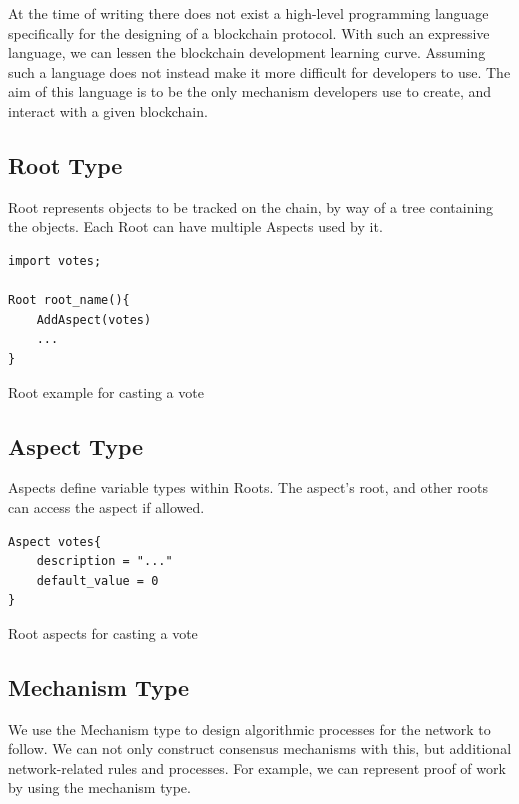 \documentclass[12pt, titlepage, twocolumn]{report}
\begin{document}
At the time of writing there does not exist a high-level programming language specifically for the designing of a blockchain protocol. With such an expressive language, we can lessen the blockchain development learning curve. Assuming such a language does not instead make it more difficult for developers to use. The aim of this language is to be the only mechanism developers use to create, and interact with a given blockchain.


\subsection{Root Type}
Root represents objects to be tracked on the chain,  by way of a tree containing the objects. Each Root can have multiple Aspects used by it.

\begin{listing}[ht]
\begin{minipage}{\linewidth}
\begin{lstlisting}
import votes;

Root root_name(){
	AddAspect(votes)
	...
}
\end{lstlisting}
\end{minipage}
\caption{Root example for casting a vote}
\label{code:2}
\end{listing}


\subsection{Aspect Type}
Aspects define variable types within Roots. The aspect's root, and other roots can access the aspect if allowed.

\begin{listing}[ht]
\begin{minipage}{\linewidth}
\begin{lstlisting}
Aspect votes{
	description = "..."
	default_value = 0
}

\end{lstlisting}
\end{minipage}
\caption{Root aspects for casting a vote}
\label{code:4}
\end{listing}



\subsection{Mechanism Type}
We use the Mechanism type to design algorithmic processes for the network to follow. We can not only construct consensus mechanisms with this, but additional network-related rules and processes. For example, we can represent proof of work by using the mechanism type.
\end{document}
